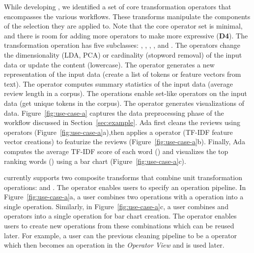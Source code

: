While developing \system, we identified a set of core transformation operators that encompasses the various \vita workflows. 
These transforms manipulate the
components of the selection they are applied to. 
Note that the core operator set is minimal, and there is room for adding more operators to make \vta more expressive (\textbf{D4}). 
The transformation operation has five subclasses: , , , , and . The  operators change the dimensionality (\eg LDA, PCA) or cardinality (\eg stopword removal) of the input data or update the content (\eg lowercase). The  operator generates a new representation of the input data (\eg create a list of tokens or feature vectors from text). The  operator computes summary statistics of the input data (\eg average review length in a corpus). The  operations enable set-like operators on the input data (\eg get unique tokens in the corpus). The  operator generates visualizations of data. Figure~\ref{fig:use-case-a} captures the data preprocessing phase of the workflow discussed in Section~\ref{sec:example}. Ada first cleans the reviews using  operators (Figure~\ref{fig:use-case-a}a),then applies a  operator (\eg TF-IDF feature vector creations) to featurize the reviews (Figure~\ref{fig:use-case-a}b). Finally, Ada computes the average TF-IDF score of each word () and visualizes the top ranking words () using a bar chart (Figure~\ref{fig:use-case-a}c). 



\vta currently supports two composite transforms that combine unit transformation operations:  and . The  operator enables users to specify an operation pipeline. In Figure~\ref{fig:use-case-a}a, a user combines two  operations with a  operation into a single operation. Similarly, in Figure~\ref{fig:use-case-a}c, a user combines  and  operators into a single operation for bar chart creation. The  operator enables users to create new operations from these combinations which can be reused later. For example, a user can  the previous cleaning pipeline to be a  operator which then becomes an operation in the \emph{Operator View} and is used later.




